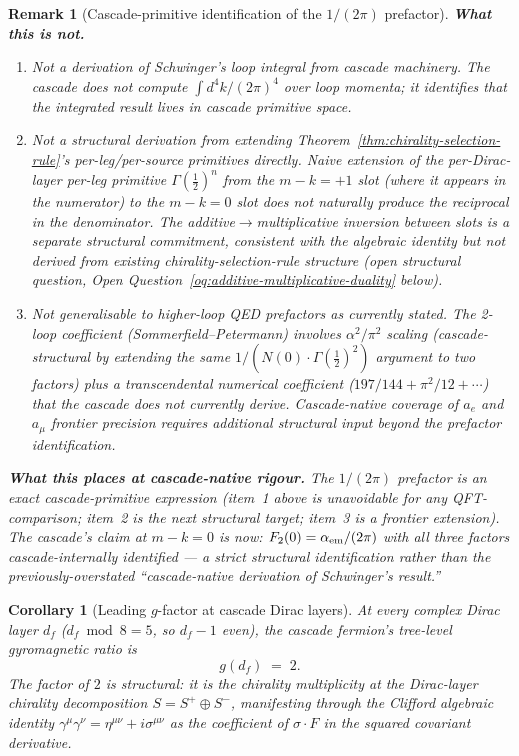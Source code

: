 \documentclass[12pt,a4paper]{article}
\newtheorem{corollary}[theorem]{Corollary}
\newtheorem*{remark}{Remark}
\begin{document}
\begin{remark}[Cascade-primitive identification of the $1/(2\pi)$ prefactor]
\medskip\noindent\textbf{What this is not.}
\begin{enumerate}[label=(\arabic*),nosep]
\item Not a derivation of Schwinger's loop integral from cascade machinery. The cascade does not compute $\int d^4 k/(2\pi)^4$ over loop momenta; it identifies that the integrated result lives in cascade primitive space.
\item Not a structural derivation from extending Theorem~\ref{thm:chirality-selection-rule}'s per-leg/per-source primitives directly. Naive extension of the per-Dirac-layer per-leg primitive $\Gamma(\tfrac{1}{2})^n$ from the $m-k=+1$ slot (where it appears in the numerator) to the $m-k=0$ slot does not naturally produce the \emph{reciprocal} in the denominator. The additive$\to$multiplicative inversion between slots is a separate structural commitment, consistent with the algebraic identity but not derived from existing chirality-selection-rule structure (open structural question, Open Question~\ref{oq:additive-multiplicative-duality} below).
\item Not generalisable to higher-loop QED prefactors as currently stated. The 2-loop coefficient (Sommerfield--Petermann) involves $\alpha^2/\pi^2$ scaling (cascade-structural by extending the same $1/(N(0)\cdot\Gamma(\tfrac{1}{2})^2)$ argument to two factors) plus a transcendental numerical coefficient ($197/144 + \pi^2/12 + \cdots$) that the cascade does not currently derive. Cascade-native coverage of $a_e$ and $a_\mu$ frontier precision requires additional structural input beyond the prefactor identification.
\end{enumerate}

\medskip\noindent\textbf{What this places at cascade-native rigour.} The $1/(2\pi)$ prefactor is an exact cascade-primitive expression (item~1 above is unavoidable for any QFT-comparison; item~2 is the next structural target; item~3 is a frontier extension). The cascade's claim at $m-k=0$ is now: $F_2(0) = \alpha_{\rm em}/(2\pi)$ with all three factors cascade-internally identified --- a strict structural identification rather than the previously-overstated ``cascade-native derivation of Schwinger's result.''
\end{remark}

\begin{corollary}[Leading $g$-factor at cascade Dirac layers]\label{cor:g-equals-two}
At every complex Dirac layer $d_f$ ($d_f \bmod 8 = 5$, so $d_f - 1$
even), the cascade fermion's tree-level gyromagnetic ratio is
\[
g(d_f) \;=\; 2.
\]
The factor of $2$ is structural: it is the chirality multiplicity at
the Dirac-layer chirality decomposition $S = S^+ \oplus S^-$,
manifesting through the Clifford algebraic identity
$\gamma^\mu\gamma^\nu = \eta^{\mu\nu} + i\sigma^{\mu\nu}$ as the
coefficient of $\sigma\cdot F$ in the squared covariant derivative.
\end{corollary}
\end{document}
